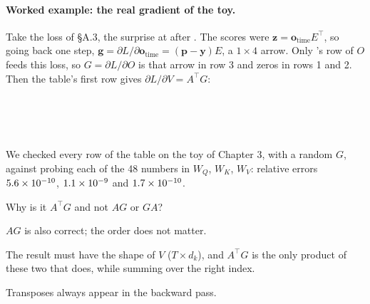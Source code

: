 \paragraph{Worked example: the real gradient of the toy.} Take the loss of \S A.3, the surprise at
 after . The scores were $\bm{z}=\bm{o}_{\text{time}}E^\top$, so going back one
step, $\bm{g}=\partial L/\partial\bm{o}_{\text{time}} = (\bm{p}-\bm{y})E$, a $1\times4$ arrow. Only 's row
of $O$ feeds this loss, so $G=\partial L/\partial O$ is that arrow in row 3 and zeros in rows 1 and 2. Then the
table's first row gives $\partial L/\partial V = A^\top G$:

\par\medskip\noindent\begin{minipage}{\linewidth}\centering
\fitR{}\\[2pt]
\\[10pt]
\fitR{}\\[2pt]

\end{minipage}\par\medskip

We checked every row of the table on the toy of Chapter 3, with a random $G$, against probing each of the 48
numbers in $W_Q$, $W_K$, $W_V$: relative errors $5.6\times10^{-10}$, $1.1\times10^{-9}$ and $1.7\times10^{-10}$.

\begin{checkq}
Why is it $A^\top G$ and not $AG$ or $GA$?
\begin{options}
\item $AG$ is also correct; the order does not matter.
\item The result must have the shape of $V$ ($T\times d_k$), and $A^\top G$ is the only product of these two
that does, while summing over the right index.
\item Transposes always appear in the backward pass.
\end{options}
\end{checkq}

